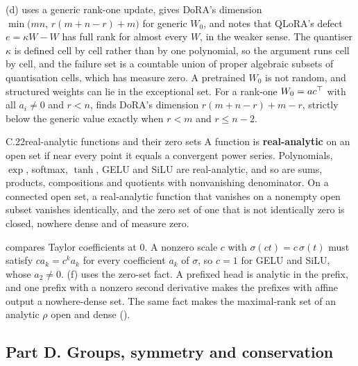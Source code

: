 (d) uses a generic rank-one update,  gives DoRA's dimension
$\min\big(mn,\,r(m+n-r)+m\big)$ for generic $W_0$, and  notes that QLoRA's
\citep{dettmers2023qlora} defect $e=\kappa W-W$ has full rank for almost every $W$, in the weaker sense. The quantiser
$\kappa$ is defined cell by cell rather than by one polynomial, so the argument runs cell by cell, and the failure set
is a countable union of proper algebraic subsets of quantisation cells, which has measure zero. A pretrained $W_0$ is
not random, and structured weights can lie in the exceptional set. For a rank-one $W_0=ac^{\top}$ with all $a_i\ne0$ and
$r<n$,  finds DoRA's dimension $r(m+n-r)+m-r$, strictly below the generic value exactly when
$r<m$ and $r\le n-2$.


\begin{bgentry}{C.22}{real-analytic functions and their zero sets}
A function is \textbf{real-analytic} on an open set if near every point it equals a convergent power series.
Polynomials, $\exp$, softmax, $\tanh$, GELU and SiLU are real-analytic, and so are sums, products, compositions and
quotients with nonvanishing denominator. On a connected open set, a real-analytic function that vanishes on a nonempty
open subset vanishes identically, and the zero set of one that is not identically zero is closed, nowhere dense and of
measure zero.
\end{bgentry}

 compares Taylor coefficients at $0$. A nonzero scale $c$ with $\sigma(ct)=c\,\sigma(t)$ must
satisfy $ca_k=c^ka_k$ for every coefficient $a_k$ of $\sigma$, so $c=1$ for GELU and SiLU, whose $a_2\ne0$.
(f) uses the zero-set fact. A prefixed head is analytic in the prefix, and one prefix with a
nonzero second derivative makes the prefixes with affine output a nowhere-dense set. The same fact makes the
maximal-rank set of an analytic $\rho$ open and dense ().


\subsection*{Part D. Groups, symmetry and conservation}
\label{app:bg-d}

